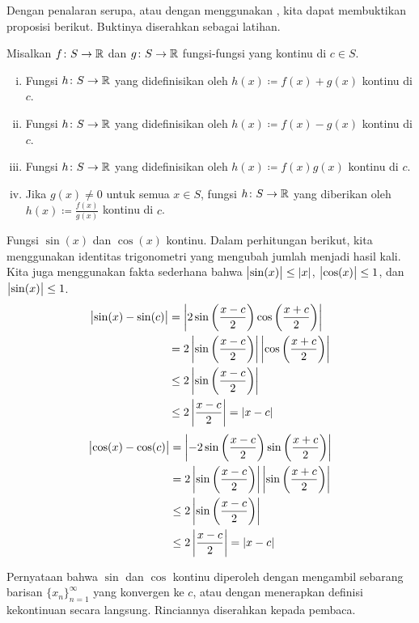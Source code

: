 Dengan penalaran serupa, atau dengan menggunakan ,
kita dapat membuktikan proposisi berikut.  Buktinya diserahkan sebagai
latihan.

\begin{prop} \label{contalg:prop}
Misalkan $f \colon S \to {\mathbb{R}}$ dan $g \colon S \to {\mathbb{R}}$ fungsi-fungsi yang
kontinu di $c \in S$.
\begin{enumerate}[(i)]
\item Fungsi $h \colon S \to {\mathbb{R}}$ yang didefinisikan oleh
$h(x) \coloneqq f(x)+g(x)$ kontinu di $c$.
\item Fungsi $h \colon S \to {\mathbb{R}}$ yang didefinisikan oleh
$h(x) \coloneqq f(x)-g(x)$ kontinu di $c$.
\item Fungsi $h \colon S \to {\mathbb{R}}$ yang didefinisikan oleh
$h(x) \coloneqq f(x)g(x)$ kontinu di $c$.
\item Jika $g(x) \neq 0$ untuk semua $x \in S$, fungsi $h \colon S \to {\mathbb{R}}$
yang diberikan oleh $h(x) \coloneqq \frac{f(x)}{g(x)}$ kontinu di $c$.
\end{enumerate}
\end{prop}

\begin{example} \label{sincos:example}
Fungsi $\sin(x)$ dan $\cos(x)$ kontinu.
Dalam perhitungan berikut, kita menggunakan identitas trigonometri
yang mengubah jumlah menjadi hasil kali.  Kita juga menggunakan fakta sederhana bahwa
$\bigl\lvert {\sin(x)} \bigr\rvert \leq \lvert {x} \rvert$, $\bigl\lvert {\cos(x)} \bigr\rvert \leq 1$,
dan $\bigl\lvert {\sin(x)} \bigr\rvert \leq 1$.
\begin{equation*}
\begin{split}
\bigl\lvert {\sin(x)-\sin(c)} \bigr\rvert & =
\left\lvert {
2 \sin \left( \frac{x-c}{2} \right) \cos \left( \frac{x+c}{2} \right)
} \right\rvert
\\
& =
2
\left\lvert { \sin \left( \frac{x-c}{2} \right) } \right\rvert
\left\lvert { \cos \left( \frac{x+c}{2} \right) } \right\rvert
\\
& \leq
2
\left\lvert { \sin \left( \frac{x-c}{2} \right) } \right\rvert
\\
& \leq
2
\left\lvert { \frac{x-c}{2} } \right\rvert
= \lvert {x-c} \rvert
\end{split}
\end{equation*}
\begin{equation*}
\begin{split}
\bigl\lvert {\cos(x)-\cos(c)} \bigr\rvert & =
\left\lvert {
-2 \sin \left( \frac{x-c}{2} \right) \sin \left( \frac{x+c}{2} \right)
} \right\rvert
\\
& =
2
\left\lvert { \sin \left( \frac{x-c}{2} \right) } \right\rvert
\left\lvert { \sin \left( \frac{x+c}{2} \right) } \right\rvert
\\
& \leq
2
\left\lvert { \sin \left( \frac{x-c}{2} \right) } \right\rvert
\\
& \leq
2
\left\lvert { \frac{x-c}{2} } \right\rvert
= \lvert {x-c} \rvert
\end{split}
\end{equation*}

Pernyataan bahwa $\sin$ dan $\cos$ kontinu diperoleh dengan mengambil
sebarang barisan $\{ x_n \}_{n=1}^\infty$ yang konvergen ke $c$, atau dengan menerapkan
definisi kekontinuan secara langsung.  Rinciannya diserahkan kepada
pembaca.
\end{example}

